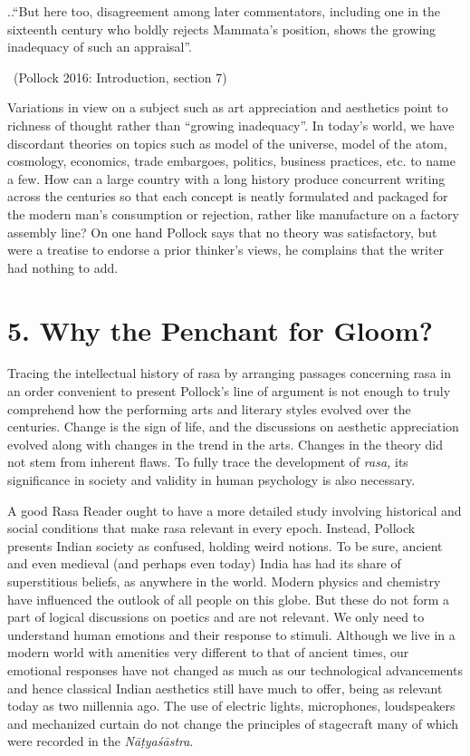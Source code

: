 
\begin{myquote}
..``But here too, disagreement among later commentators, including one in the sixteenth century who boldly rejects Mammata’s position, shows the growing inadequacy of such an appraisal”. 

~\hfill (Pollock 2016: Introduction, section 7)
\end{myquote}

Variations in view on a subject such as art appreciation and aesthetics point to richness of thought rather than “growing inadequacy”. In today’s world, we have discordant theories on topics such as model of the universe, model of the atom, cosmology, economics, trade embargoes, politics, business practices, etc. to name a few. How can a large country with a long history produce concurrent writing across the centuries so that each concept is neatly formulated and packaged for the modern man’s consumption or rejection, rather like manufacture on a factory assembly line? On one hand Pollock says that no theory was satisfactory, but were a treatise to endorse a prior thinker’s views, he complains that the writer had nothing to add.


\section*{5. Why the Penchant for Gloom?}

Tracing the intellectual history of rasa by arranging passages concerning rasa in an order convenient to present Pollock’s line of argument is not enough to truly comprehend how the performing arts and literary styles evolved over the centuries. Change is the sign of life, and the discussions on aesthetic appreciation evolved along with changes in the trend in the arts. Changes in the theory did not stem from inherent flaws. To fully trace the development of \textit{rasa,} its significance in society and validity in human psychology is also necessary.

\newpage

A good Rasa Reader ought to have a more detailed study involving historical and social conditions that make rasa relevant in every epoch. Instead, Pollock presents Indian society as confused, holding weird notions. To be sure, ancient and even medieval (and perhaps even today) India has had its share of superstitious beliefs, as anywhere in the world. Modern physics and chemistry have influenced the outlook of all people on this globe. But these do not form a part of logical discussions on poetics and are not relevant. We only need to understand human emotions and their response to stimuli. Although we live in a modern world with amenities very different to that of ancient times, our emotional responses have not changed as much as our technological advancements and hence classical Indian aesthetics still have much to offer, being as relevant today as two millennia ago. The use of electric lights, microphones, loudspeakers and mechanized curtain do not change the principles of stagecraft many of which were recorded in the \textit{Nāṭyaśāstra}.

